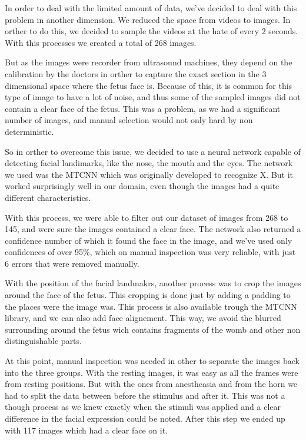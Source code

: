 In order to deal with the limited amount of data, we've decided to deal with this problem in another dimension. We reduced the space from videos to images. In orther to do this, we decided to sample the videos at the hate of every 2 seconds. With this processes we created a total of 268 images.

But as the images were recorder from ultrasound machines, they depend on the calibration by the doctors in orther to capture the exact section in the 3 dimensional space where the fetus face is. Because of this, it is common for this type of image to have a lot of noise, and thus some of the sampled images did not contain a clear face of the fetus. This was a problem, as we had a significant number of images, and manual selection would not only hard by non deterministic.

So in orther to overcome this issue, we decided to use a neural network capable of detecting facial landimarks, like the nose, the mouth and the eyes. The network we used was the MTCNN \cite{} which was originally developed to recognize X. But it worked surprisingly well in our domain, even though the images had a quite different characteristics.

With this process, we were able to filter out our dataset of images from 268 to 145, and were sure the images contained a clear face. The network also returned a confidence number of which it found the face in the image, and we've used only confidences of over 95\%, which on manual inspection was very reliable, with just 6 errors that were removed manually.

With the position of the facial landmakrs, another process was to crop the images around the face of the fetus. This cropping is done just by adding a padding to the places were the image was. This process is also available trough the MTCNN library, and we can also add face alignement. This way, we avoid the blurred surrounding around the fetus wich contains fragments of the womb and other non distinguishable parts. 

At this point, manual inspection was needed in other to separate the images back into the three groups. With the resting images, it was easy as all the frames were from resting positions. But with the ones from anestheasia and from the horn we had to split the data between before the stimulus and after it. This was not a though process as we knew exactly when the stimuli was applied and a clear difference in the facial expression could be noted. After this step we ended up with 117 images which had a clear face on it.

